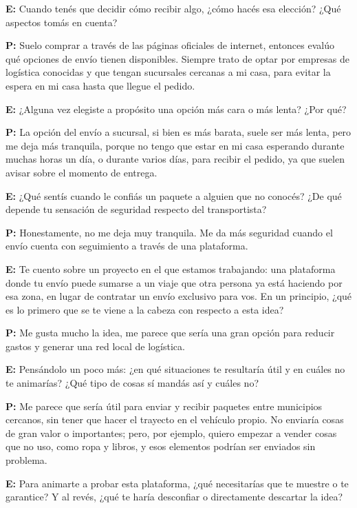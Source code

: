 {\noindent\textbf{E:} Cuando tenés que decidir cómo recibir algo, ¿cómo hacés esa elección? ¿Qué aspectos tomás en cuenta?

\noindent\textbf{P:} Suelo comprar a través de las páginas oficiales de internet, entonces evalúo qué opciones de envío tienen disponibles. Siempre trato de optar por empresas de logística conocidas y que tengan sucursales cercanas a mi casa, para evitar la espera en mi casa hasta que llegue el pedido.

\noindent\textbf{E:} ¿Alguna vez elegiste a propósito una opción más cara o más lenta? ¿Por qué?

\noindent\textbf{P:} La opción del envío a sucursal, si bien es más barata, suele ser más lenta, pero me deja más tranquila, porque no tengo que estar en mi casa esperando durante muchas horas un día, o durante varios días, para recibir el pedido, ya que suelen avisar sobre el momento de entrega.

\noindent\textbf{E:} ¿Qué sentís cuando le confiás un paquete a alguien que no conocés? ¿De qué depende tu sensación de seguridad respecto del transportista?

\noindent\textbf{P:} Honestamente, no me deja muy tranquila. Me da más seguridad cuando el envío cuenta con seguimiento a través de una plataforma.

\noindent\textbf{E:} Te cuento sobre un proyecto en el que estamos trabajando: una plataforma donde tu envío puede sumarse a un viaje que otra persona ya está haciendo por esa zona, en lugar de contratar un envío exclusivo para vos. En un principio, ¿qué es lo primero que se te viene a la cabeza con respecto a esta idea?

\noindent\textbf{P:} Me gusta mucho la idea, me parece que sería una gran opción para reducir gastos y generar una red local de logística.

\noindent\textbf{E:} Pensándolo un poco más: ¿en qué situaciones te resultaría útil y en cuáles no te animarías? ¿Qué tipo de cosas sí mandás así y cuáles no?

\noindent\textbf{P:} Me parece que sería útil para enviar y recibir paquetes entre municipios cercanos, sin tener que hacer el trayecto en el vehículo propio. No enviaría cosas de gran valor o importantes; pero, por ejemplo, quiero empezar a vender cosas que no uso, como ropa y libros, y esos elementos podrían ser enviados sin problema.

\noindent\textbf{E:} Para animarte a probar esta plataforma, ¿qué necesitarías que te muestre o te garantice? Y al revés, ¿qué te haría desconfiar o directamente descartar la idea?

}
